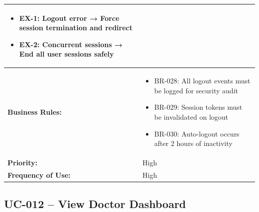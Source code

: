 \documentclass[12pt,a4paper]{article}
\begin{document}
\begin{longtable}{|p{4.5cm}|p{10.5cm}|}
\begin{itemize}
  \item EX-1: Logout error → Force session termination and redirect
  \item EX-2: Concurrent sessions → End all user sessions safely
\end{itemize} \\
\hline
\textbf{Business Rules:} &
\begin{itemize}
  \item BR-028: All logout events must be logged for security audit
  \item BR-029: Session tokens must be invalidated on logout
  \item BR-030: Auto-logout occurs after 2 hours of inactivity
\end{itemize} \\
\hline
\textbf{Priority:} & High \\
\hline
\textbf{Frequency of Use:} & High \\
\hline
\end{longtable}

\subsection{UC-012 – View Doctor Dashboard}
\end{document}
